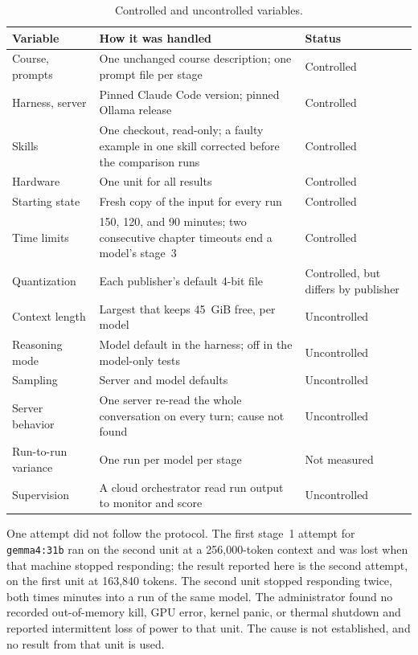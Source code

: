 \documentclass[11pt]{article}
\newcommand{\mdl}[1]{\texttt{#1}}
\newcommand{\Gthirtyone}{\mdl{gemma4:31b}}
\begin{document}
\begin{table}[htbp]
\centering
\small
\begin{tabularx}{\textwidth}{@{}lXl@{}}
\toprule
\textbf{Variable} & \textbf{How it was handled} & \textbf{Status} \\
\midrule
Course, prompts & One unchanged course description; one prompt file per stage & Controlled \\
Harness, server & Pinned Claude Code version; pinned Ollama release & Controlled \\
Skills & One checkout, read-only; a faulty example in one skill corrected before the comparison runs & Controlled \\
Hardware & One unit for all results & Controlled \\
Starting state & Fresh copy of the input for every run & Controlled \\
Time limits & 150, 120, and 90 minutes; two consecutive chapter timeouts end a model's stage~3 & Controlled \\
Quantization & Each publisher's default 4-bit file & Controlled, but differs by publisher \\
Context length & Largest that keeps 45~GiB free, per model & Uncontrolled \\
Reasoning mode & Model default in the harness; off in the model-only tests & Uncontrolled \\
Sampling & Server and model defaults & Uncontrolled \\
Server behavior & One server re-read the whole conversation on every turn; cause not found & Uncontrolled \\
Run-to-run variance & One run per model per stage & Not measured \\
Supervision & A cloud orchestrator read run output to monitor and score & Uncontrolled \\
\bottomrule
\end{tabularx}
\caption{Controlled and uncontrolled variables.}
\label{tab:controls}
\end{table}

One attempt did not follow the protocol. The first stage~1 attempt for \Gthirtyone{} ran on the second unit at a 256,000-token context and was lost when that machine stopped responding; the result reported here is the second attempt, on the first unit at 163,840 tokens. The second unit stopped responding twice, both times minutes into a run of the same model. The administrator found no recorded out-of-memory kill, GPU error, kernel panic, or thermal shutdown and reported intermittent loss of power to that unit. The cause is not established, and no result from that unit is used.
\end{document}

